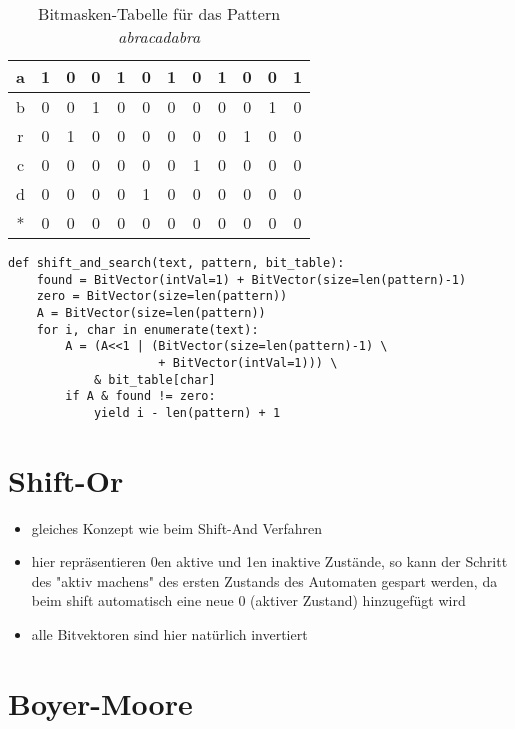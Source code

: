 \documentclass[11pt]{article}
\begin{document}
\begin{table}[H]
\begin{center}
    \begin{tabular}{|c|c|c|c|c|c|c|c|c|c|c|c|}
	    \hline
	    a & 1 & 0 & 0 & 1 & 0 & 1 & 0 & 1 & 0 & 0 & 1 \\
	    \hline
	    b & 0 & 0 & 1 & 0 & 0 & 0 & 0 & 0 & 0 & 1 & 0 \\
	    \hline
	    r & 0 & 1 & 0 & 0 & 0 & 0 & 0 & 0 & 1 & 0 & 0 \\
	    \hline
	    c & 0 & 0 & 0 & 0 & 0 & 0 & 1 & 0 & 0 & 0 & 0 \\
	    \hline
	    d & 0 & 0 & 0 & 0 & 1 & 0 & 0 & 0 & 0 & 0 & 0 \\
	    \hline
	    * & 0 & 0 & 0 & 0 & 0 & 0 & 0 & 0 & 0 & 0 & 0 \\
	    \hline
    \end{tabular}
\end{center}
\caption{Bitmasken-Tabelle für das Pattern \emph{abracadabra}}
\end{table}

\begin{lstlisting}
def shift_and_search(text, pattern, bit_table):
    found = BitVector(intVal=1) + BitVector(size=len(pattern)-1)
    zero = BitVector(size=len(pattern))
    A = BitVector(size=len(pattern))
    for i, char in enumerate(text):
        A = (A<<1 | (BitVector(size=len(pattern)-1) \
                     + BitVector(intVal=1))) \
            & bit_table[char]
        if A & found != zero:
            yield i - len(pattern) + 1
\end{lstlisting}

\section{Shift-Or}

\begin{itemize}
	\item gleiches Konzept wie beim Shift-And Verfahren
	\item hier repräsentieren 0en aktive und 1en inaktive Zustände, so kann der Schritt des "aktiv machens" des ersten Zustands des Automaten gespart werden, da beim shift automatisch eine neue 0 (aktiver Zustand) hinzugefügt wird
	\item alle Bitvektoren sind hier natürlich invertiert
\end{itemize}


\section{Boyer-Moore}
\end{document}
